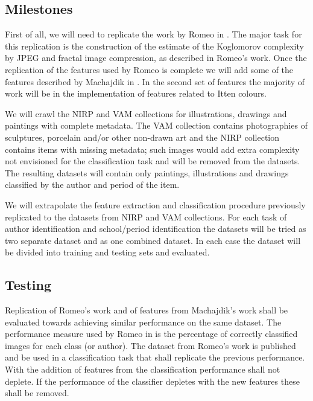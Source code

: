 \documentclass[a4paper]{article}
\begin{document}
\subsection{Milestones}

First of all, we will need to replicate the work by Romeo in \cite{rmc12ajs}.
The major task for this replication is the construction of the estimate of the
Koglomorov complexity by JPEG and fractal image compression, as described in
Romeo's work. Once the replication of the features used by Romeo is complete we
will add some of the features described by Machajdik in \cite{mach10clas}.  In
the second set of features the majority of work will be in the implementation
of features related to Itten colours.

We will crawl the NIRP and VAM collections for illustrations, drawings and
paintings with complete metadata.  The VAM collection contains photographies of
sculptures, porcelain and/or other non-drawn art and the NIRP collection
contains items with missing metadata; such images would add extra complexity
not envisioned for the classification task and will be removed from the
datasets.  The resulting datasets will contain only paintings, illustrations
and drawings classified by the author and period of the item.

We will extrapolate the feature extraction and classification procedure
previously replicated to the datasets from NIRP and VAM collections.  For each
task of author identification and school/period identification the datasets
will be tried as two separate dataset and as one combined dataset.  In each
case the dataset will be divided into training and testing sets and evaluated.

\subsection{Testing}

Replication of Romeo's work and of features from Machajdik's work shall be
evaluated towards achieving similar performance on the same dataset.  The
performance measure used by Romeo in \cite{rmc12ajs} is the percentage of
correctly classified images for each class (or author).  The dataset from
Romeo's work is published and be used in a classification task that shall
replicate the previous performance.  With the addition of features from
\cite{mach10clas} the classification performance shall not deplete.  If the
performance of the classifier depletes with the new features these shall be
removed.
\end{document}
